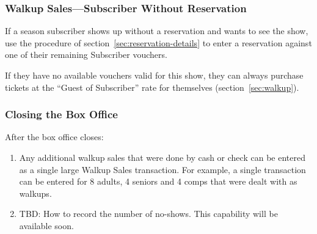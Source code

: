 \subsubsection{Walkup Sales---Subscriber Without Reservation}
\label{sec:walkupsubscriber}

If a season subscriber shows up without a reservation and wants to see
the show, use the procedure of section~\ref{sec:reservation-details} to 
enter a reservation against one of their remaining Subscriber vouchers.

If they have no available vouchers valid for this show, they can always
purchase tickets at the ``Guest of Subscriber'' rate for themselves
(section~\ref{sec:walkup}). 


\subsubsection{Closing the Box Office}

After the box office closes:

\begin{enumerate}
\item Any additional walkup sales that were done by cash or check can be
  entered as a single large Walkup Sales transaction.  For example, a
  single transaction can be entered for 8 adults, 4 seniors and 4 comps
  that were dealt with as walkups.
\item TBD:  How to record the number of no-shows.  This capability will
  be available soon.
\end{enumerate}
